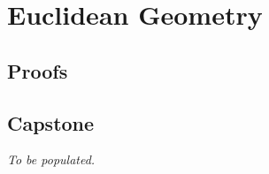 \chapter{Euclidean Geometry}


\clearpage

\section*{Proofs}


\section*{Capstone}
\textit{To be populated.}
